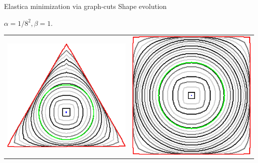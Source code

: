 \begin{frame}
{Elastica minimization via graph-cuts}
{Shape evolution}

\begin{center}
$\alpha=1/8^2, \beta=1.$\\[1em]

\begin{tabular}{cc}
\includegraphics[scale=0.1]{figures/graphcut/no-neighborhood-flow-always-evolve/0.015625/triangle.png}\hspace{3em} &
\includegraphics[scale=0.08]{figures/graphcut/no-neighborhood-flow-always-evolve/0.015625/square.png}\\[1em]

\end{tabular}
\end{center}
\end{frame}
